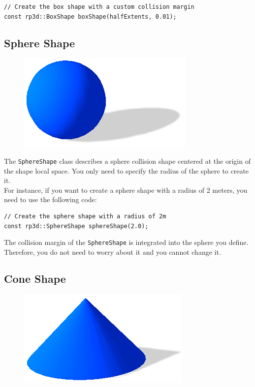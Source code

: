\documentclass[a4paper,12pt]{article}
\begin{document}
   \begin{lstlisting}
// Create the box shape with a custom collision margin
const rp3d::BoxShape boxShape(halfExtents, 0.01);
  \end{lstlisting}

    \subsection{Sphere Shape}

    \begin{figure}[h]
        \centering
        \includegraphics{sphereshape.png}
        \label{fig:sphereshape}
    \end{figure}

    The \texttt{SphereShape} class describes a sphere collision shape centered at the origin of the shape local space. You only need to specify the radius of the sphere to create it. \\

    For instance, if you want to create a sphere shape with a radius of 2 meters, you need to use the following code: \\

    \begin{lstlisting}
// Create the sphere shape with a radius of 2m
const rp3d::SphereShape sphereShape(2.0);
  \end{lstlisting}

    \vspace{0.6cm}

    The collision margin of the \texttt{SphereShape} is integrated into the sphere you define. Therefore, you do not need to worry about it and you cannot change it.

    \subsection{Cone Shape}

    \begin{figure}[h]
        \centering
        \includegraphics{coneshape.png}
        \label{fig:coneshape}
    \end{figure}
\end{document}
